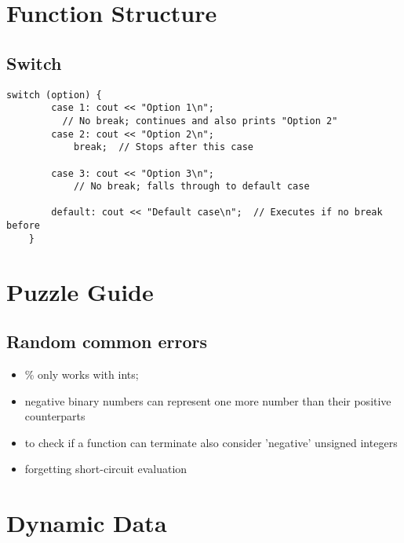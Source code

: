 \section{Function Structure}
\subsection{Switch}
\begin{lstlisting}[style=codeexpert]
    switch (option) {
        case 1: cout << "Option 1\n"; 
          // No break; continues and also prints "Option 2"
        case 2: cout << "Option 2\n"; 
            break;  // Stops after this case

        case 3: cout << "Option 3\n"; 
            // No break; falls through to default case

        default: cout << "Default case\n";  // Executes if no break before
    }
\end{lstlisting}

\section{Puzzle Guide}
\subsection{Random common errors}
\begin{itemize}
    \item \% only works with ints;
    \item negative binary numbers can represent one more number than their positive counterparts 
    \item to check if a function can terminate also consider 'negative' unsigned integers
    \item forgetting short-circuit evaluation
\end{itemize}

\section{Dynamic Data}
